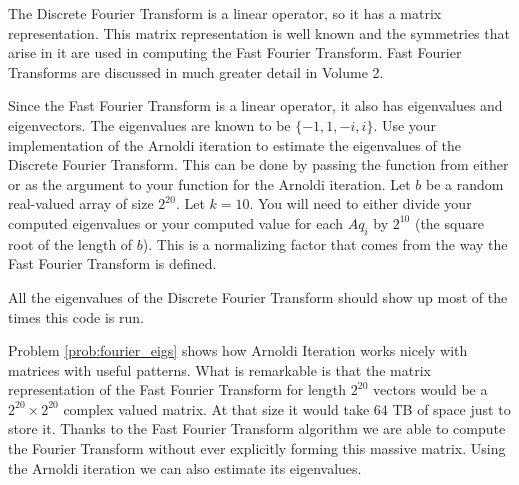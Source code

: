 \begin{problem}
\label{prob:fourier_eigs}
The Discrete Fourier Transform is a linear operator, so it has a matrix representation.
This matrix representation is well known and the symmetries that arise in it are used in computing the Fast Fourier Transform.
Fast Fourier Transforms are discussed in much greater detail in Volume 2.

Since the Fast Fourier Transform is a linear operator, it also has eigenvalues and eigenvectors.
The eigenvalues are known to be $\{ -1, 1, -i, i \}$.
Use your implementation of the Arnoldi iteration to estimate the eigenvalues of the Discrete Fourier Transform.
This can be done by passing the  function from either  or  as the argument  to your function for the Arnoldi iteration.
Let $b$ be a random real-valued array of size $2^{20}$.
Let $k = 10$.
You will need to either divide your computed eigenvalues or your computed value for each $A q_i$ by $2^{10}$ (the square root of the length of $b$).
This is a normalizing factor that comes from the way the Fast Fourier Transform is defined.

All the eigenvalues of the Discrete Fourier Transform should show up most of the times this code is run.
\end{problem}

Problem \ref{prob:fourier_eigs} shows how Arnoldi Iteration works nicely with matrices with useful patterns.
What is remarkable is that the matrix representation of the Fast Fourier Transform for length $2^{20}$ vectors would be a $2^{20} \times 2^{20}$ complex valued matrix.
At that size it would take $64$ TB of space just to store it.
Thanks to the Fast Fourier Transform algorithm we are able to compute the Fourier Transform without ever explicitly forming this massive matrix.
Using the Arnoldi iteration we can also estimate its eigenvalues.


